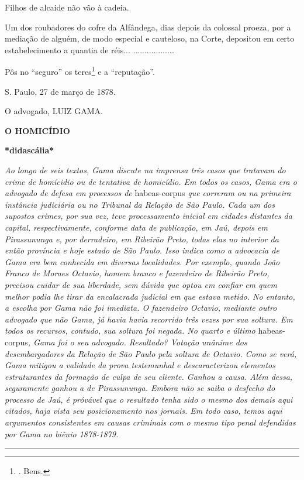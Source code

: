 Filhos de alcaide não vão à cadeia.

Um dos roubadores do cofre da Alfândega, dias depois da colossal proeza,
por a mediação de alguém, de modo especial e cauteloso, na Corte,
depositou em certo estabelecimento a quantia de réis...
................\ldots{}

Pôs no ``seguro'' os teres\footnote{. Bens.} e a ``reputação''.

S. Paulo, 27 de março de 1878.

O advogado, LUIZ GAMA.

\textbf{O HOMICÍDIO}

\textbf{*didascália*}

\emph{Ao longo de seis textos, Gama discute na imprensa três casos que
tratavam do crime de homícidio ou de tentativa de homicídio. Em todos os
casos, Gama era o advogado de defesa em processos de} habeas-corpus
\emph{que correram ou na primeira instância judiciária ou no Tribunal da
Relação de São Paulo. Cada um dos supostos crimes, por sua vez, teve
processamento inicial em cidades distantes da capital, respectivamente,
conforme data de publicação, em Jaú, depois em Pirassununga e, por
derradeiro, em Ribeirão Preto, todas elas no interior da então província
e hoje estado de São Paulo. Isso indica como a advocacia de Gama era bem
conhecida em diversas localidades. Por exemplo, quando João Franco de
Moraes Octavio, homem branco e fazendeiro de Ribeirão Preto, precisou
cuidar de sua liberdade, sem dúvida que optou em confiar em quem melhor
podia lhe tirar da encalacrada judicial em que estava metido. No
entanto, a escolha por Gama não foi imediata. O fazendeiro Octavio,
mediante outro advogado que não Gama, já havia havia recorrido três
vezes por sua soltura. Em todos os recursos, contudo, sua soltura foi
negada. No quarto e último} habeas-corpus\emph{, Gama foi o seu
advogado. Resultado? Votação unânime dos desembargadores da Relação de
São Paulo pela soltura de Octavio. Como se verá, Gama mitigou a validade
da prova testemunhal e descaracterizou elementos estruturantes da
formação de culpa de seu cliente. Ganhou a causa. Além dessa,
seguramente ganhou a de Pirassununga. Embora não se saiba o desfecho do
processo de Jaú, é próvável que o resultado tenha sido o mesmo dos
demais aqui citados, haja vista seu posicionamento nos jornais. Em todo
caso, temos aqui argumentos consistentes em causas criminais com o mesmo
tipo penal defendidas por Gama no biênio 1878-1879. }

\begin{center}\rule{0.5\linewidth}{\linethickness}\end{center}

